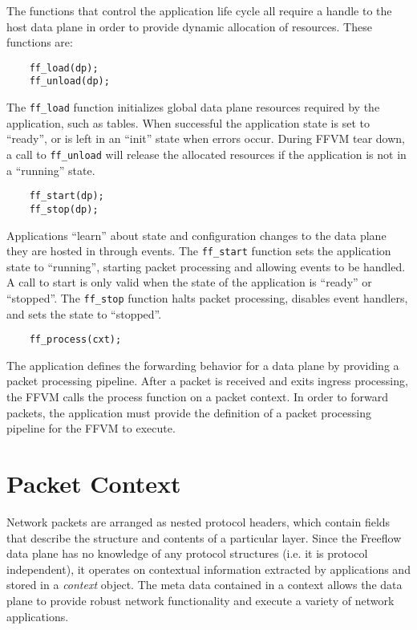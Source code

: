 The functions that control the application life cycle all require a handle
to the host data plane in order to provide dynamic allocation of resources.
These functions are:

\begin{lstlisting}
    ff_load(dp);
    ff_unload(dp);
\end{lstlisting}

The \texttt{ff\_load} function initializes global data plane resources required
by the application, such as tables. When successful the application state is
set to ``ready'', or is left in an ``init'' state when errors occur. During
FFVM tear down, a call to \texttt{ff\_unload} will release the allocated
resources if the application is not in a ``running'' state.

\begin{lstlisting}
    ff_start(dp);
    ff_stop(dp);
\end{lstlisting}

Applications ``learn'' about state and configuration changes to the data plane
they are hosted in through events. The \texttt{ff\_start} function sets the
application state to ``running'', starting packet processing and allowing events
to be handled. A call to start is only valid when the state of the application
is ``ready'' or ``stopped''. The \texttt{ff\_stop} function halts packet
processing, disables event handlers, and sets the state to ``stopped''.

\begin{lstlisting}
    ff_process(cxt);
\end{lstlisting}

The application defines the forwarding behavior for a data plane by providing
a packet processing pipeline. After a packet is received and exits ingress
processing, the FFVM calls the process function on a packet context. In order
to forward packets, the application must provide the definition of a packet
processing pipeline for the FFVM to execute.

\section{Packet Context}
\label{vm:packet-context}
Network packets are arranged as nested protocol headers, which contain fields
that describe the structure and contents of a particular layer. Since the
Freeflow data plane has no knowledge of any protocol structures (i.e. it is
protocol independent), it operates on contextual information extracted by
applications and stored in a \emph{context} object. The meta data contained
in a context allows the data plane to provide robust network functionality
and execute a variety of network applications.

